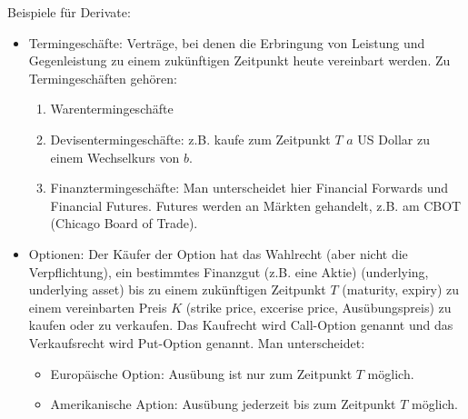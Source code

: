 \documentclass[a4paper,twoside,DIV15,BCOR12mm]{scrbook}
\begin{document}
Beispiele für Derivate:
\begin{itemize}
\item Termingeschäfte: Verträge, bei denen die Erbringung von Leistung und Gegenleistung zu einem zukünftigen Zeitpunkt heute vereinbart werden. Zu Termingeschäften gehören:
\begin{enumerate}
\item Warentermingeschäfte
\item Devisentermingeschäfte: z.B. kaufe zum Zeitpunkt $T$ $a$ US Dollar zu einem Wechselkurs von $b$.
\item Finanztermingeschäfte: Man unterscheidet hier Financial Forwards und Financial Futures. Futures werden an Märkten gehandelt, z.B. am CBOT (Chicago Board of Trade). 
\end{enumerate}
\item Optionen: Der Käufer der Option hat das Wahlrecht (aber nicht die Verpflichtung), ein bestimmtes Finanzgut (z.B. eine Aktie) (underlying, underlying asset) bis zu einem zukünftigen Zeitpunkt $T$ (maturity, expiry) zu einem vereinbarten Preis $K$ (strike price, excerise price, Ausübungspreis) zu kaufen oder zu verkaufen. Das Kaufrecht wird Call-Option genannt und das Verkaufsrecht wird Put-Option genannt. Man unterscheidet:
\begin{itemize}
\item Europäische Option: Ausübung ist nur zum Zeitpunkt $T$ möglich.
\item Amerikanische Aption: Ausübung jederzeit bis zum Zeitpunkt $T$ möglich.
\end{itemize}
\end{itemize}
\end{document}
